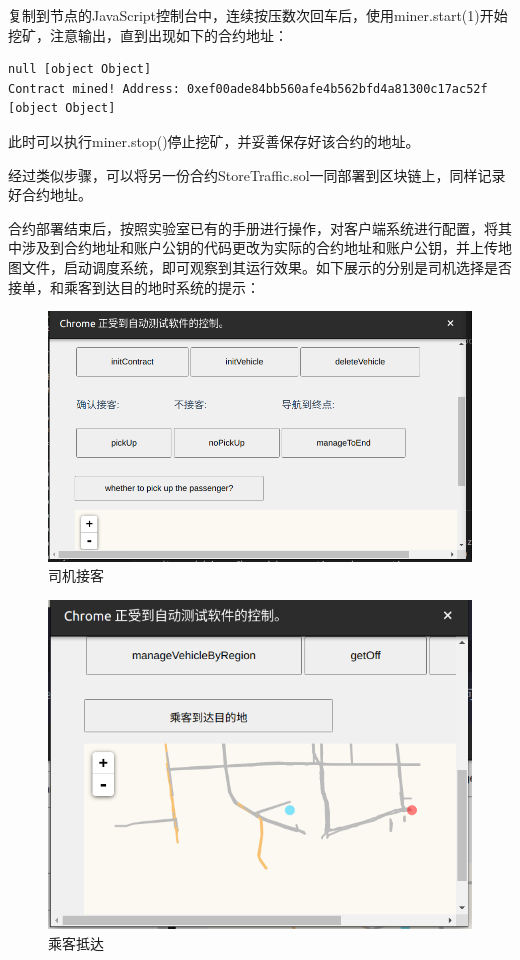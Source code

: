 复制到节点的JavaScript控制台中，连续按压数次回车后，使用miner.start(1)开始挖矿，注意输出，直到出现如下的合约地址：
\begin{lstlisting}[caption={挖矿输出合约地址}]
null [object Object]
Contract mined! Address: 0xef00ade84bb560afe4b562bfd4a81300c17ac52f
[object Object]
\end{lstlisting}

此时可以执行miner.stop()停止挖矿，并妥善保存好该合约的地址。

经过类似步骤，可以将另一份合约StoreTraffic.sol一同部署到区块链上，同样记录好合约地址。

合约部署结束后，按照实验室已有的手册进行操作，对客户端系统进行配置，将其中涉及到合约地址和账户公钥的代码更改为实际的合约地址和账户公钥，并上传地图文件，启动调度系统，即可观察到其运行效果。如下展示的分别是司机选择是否接单，和乘客到达目的地时系统的提示：

\begin{figure}[htbp]
    \centering
    \includegraphics[width=0.9\linewidth]{images/司机接客.png}
    \caption{司机接客}\label{司机接客} %
\end{figure}

\begin{figure}[htbp]
    \centering
    \includegraphics[width=0.9\linewidth]{images/乘客抵达.png}
    \caption{乘客抵达}\label{乘客抵达} %
\end{figure}

